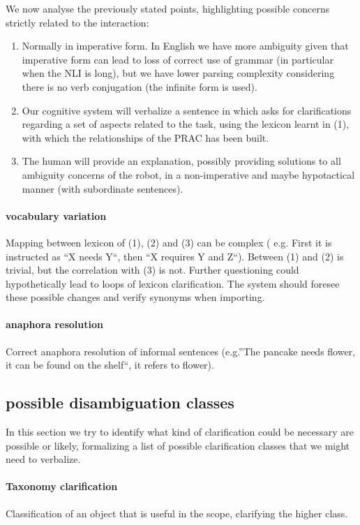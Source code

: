\documentclass[10pt,a4paper]{article}
\begin{document}
We now analyse the previously stated points, highlighting possible concerns strictly related to the interaction:
\begin{enumerate}
 \item Normally in imperative form. In English we have more ambiguity given that imperative form can
lead to loss of correct use of grammar (in particular when the NLI is long), but we have lower parsing
complexity considering there is no verb conjugation (the infinite form is used).
 \item Our cognitive system will verbalize a sentence in which asks for clarifications regarding a set of
aspects related to the task, using the lexicon learnt in (1), with which the relationships of the PRAC has
been built.
 \item The human will provide an explanation, possibly providing solutions to all ambiguity concerns of
the robot, in a non-imperative and maybe hypotactical manner (with subordinate sentences).
\end{enumerate}

\paragraph{vocabulary variation}
Mapping between lexicon of (1), (2) and (3) can be complex ( e.g. First it is instructed as ``X
needs Y``, then ``X requires Y and Z``). Between (1) and (2) is trivial, but the correlation with
(3) is not. Further questioning could hypothetically lead to loops of lexicon clarification.
The system should foresee these possible changes and verify synonyms when importing.

\paragraph{anaphora resolution}
Correct anaphora resolution of informal sentences (e.g.''The pancake needs flower, it can be found on the shelf``, it refers
to flower).

\subsection{possible disambiguation classes}
In this section we try to identify what kind of clarification could be necessary are possible or likely, formalizing a list of possible clarification classes that we might need to verbalize.

\paragraph{Taxonomy clarification}
Classification of an object that is useful in the scope, clarifying the higher class.
\end{document}
